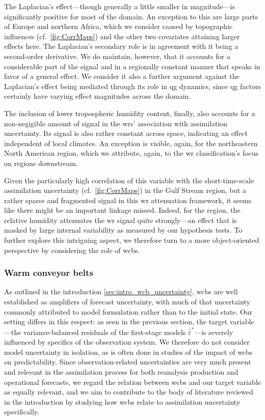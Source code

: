 The Laplacian's effect---though generally a little smaller in magnitude---is significantly positive for most of the domain. An exception to this are large parts of Europe and northern Africa, which we consider caused by topographic influences (cf.~\cref{fig:CorrMaps}) and the other two covariates attaining larger effects here. The Laplacian's secondary role is in agreement with it being a second-order derivative. We do maintain, however, that it accounts for a considerable part of the signal and in a regionally constant manner that speaks in favor of a general effect. We consider it also a further argument against the Laplacian's effect being mediated through its role in \gls{qg} dynamics, since \gls{qg} factors certainly have varying effect magnitudes across the domain.

The inclusion of lower tropospheric humidity content, finally, also accounts for a non-negigible amount of signal in the \glspl{wr}' association with assimilation uncertainty. Its signal is also rather constant across space, indicating an effect independent of local climates. An exception is visible, again, for the northeastern North American region, which we attribute, again, to the \gls{wr} classification's focus on regions downstream.

Given the particularly high correlation of this variable with the short-time-scale assimilation uncertainty (cf.~\cref{fig:CorrMaps}) in the Gulf Stream region, but a rather sparse and fragmented signal in this \gls{wr} attenuation framework, it seems like there might be an important linkage missed. Indeed, for the region, the relative humidity attenuates the \gls{wr} signal quite strongly---an effect that is masked by large internal variability as measured by our hypothesis tests. To further explore this intriguing aspect, we therefore turn to a more object-oriented perspective by considering the role of \glspl{wcb}.

\subsubsection{Warm conveyor belts}

As outlined in the introduction \cref{sec:intro_wcb_uncertainty}, \glspl{wcb} are well established as amplifiers of forecast uncertainty, with much of that uncertainty commonly attributed to model formulation rather than to the initial state. Our setting differs in this respect: as seen in the previous section, the target variable---the variance-balanced residuals of the first-stage models $\hat{\varepsilon}^*$---is severely influenced by specifics of the observation system.
We therefore do not consider model uncertainty in isolation, as is often done in studies of the impact of \glspl{wcb} on predictability. Since observation-related uncertainties are very much present and relevant in the assimilation process for both reanalysis production and operational forecasts, we regard the relation between \glspl{wcb} and our target variable as
equally relevant, and we aim to contribute to the body of literature reviewed in the introduction by studying how \glspl{wcb} relate to assimilation uncertainty specifically.

